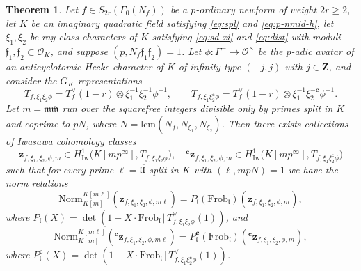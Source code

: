\documentclass[10pt,letterpaper]{amsart}
\theoremstyle{plain}
\newtheorem{thm}{Theorem}[subsection] %
\theoremstyle{definition}
\theoremstyle{definition}
\theoremstyle{plain}
\theoremstyle{plain}
\theoremstyle{plain}
\theoremstyle{remark}
\numberwithin{equation}{section}
\newcommand{\cc}{\mathbf{c}}
\newcommand{\fkm}{\mathfrak{m}}
\newcommand{\fkmbar}{\overline{\mathfrak{m}}}
\newcommand{\fkf}{\mathfrak{f}}
\newcommand{\fkl}{\mathfrak{l}}
\newcommand{\fklbar}{\overline{\mathfrak{l}}}
\def\cO{\mathcal O}
\newcommand{\Z}{\mathbf{Z}}
\begin{document}
\begin{thm}\label{maintheorem2}
Let $f\in S_{2r}(\Gamma_0(N_f))$ be a $p$-ordinary newform of weight $2r\geq 2$, let $K$ be an imaginary quadratic field satisfying \eqref{eq:spl} and \eqref{eq:p-nmid-h}, let $\xi_1,\xi_2$ be ray class characters of $K$ satisfying \eqref{eq:sd-xi} and \eqref{eq:dist} with moduli $\fkf_1,\fkf_2\subset\cO_K$, and suppose $(p,N_f\fkf_1\fkf_2)=1$.  Let $\phi:\Gamma^-\rightarrow\cO^\times$ be the $p$-adic avatar of an anticyclotomic Hecke character of $K$ of infinity type $(-j,j)$ with $j\in\Z$, and consider the $G_K$-representations
\[
T_{f,\xi_1\xi_2\phi}=T_f^\vee(1-r)\otimes\xi_1^{-1}\xi_2^{-1}\phi^{-1},\quad\quad T_{f,\xi_1\xi_2^\cc\phi}=T_f^\vee(1-r)\otimes\xi_1^{-1}\xi_2^{-\cc}\phi^{-1}.
\]
Let $m=\fkm\fkmbar$ run over the squarefree integers divisible only by primes split in $K$ and coprime to $pN$, where $N={\mathrm{lcm}}(N_f,N_{\xi_1},N_{\xi_2})$.  
Then there exists collections of Iwasawa cohomology classes
\[
\mathbf{z}_{f,\xi_1,\xi_2,\phi,m}\in H_{\mathrm{Iw}}^1\bigl(K[mp^\infty],T_{f,\xi_1\xi_2\phi}\bigr),\quad{}^\cc\mathbf{z}_{f,\xi_1,\xi_2,\phi,m}\in H_{\mathrm{Iw}}^1\bigl(K[mp^\infty],T_{f,\xi_1\xi_2^\cc\phi}\bigr)
\]
such that for every prime $\ell=\fkl\fklbar$ split in $K$ with $(\ell,mpN)=1$ we have the norm relations
\[
\mathrm{Norm}_{K[m]}^{K[m\ell]}(\mathbf{z}_{f,\xi_1,\xi_2,\phi,m\ell})=P_{\fkl}(\mathrm{Frob}_{\fkl})(\mathbf{z}_{f,\xi_1,\xi_2,\phi,m}),
\]
where $P_{\fkl}(X)=\det(1-X\cdot\mathrm{Frob}_{\fkl}\,|\,T_{f,\xi_1\xi_2\phi}^\vee(1))$, and
\[
\mathrm{Norm}_{K[m]}^{K[m\ell]}({}^\cc\mathbf{z}_{f,\xi_1,\xi_2,\phi,m\ell})=P^\cc_{\fkl}(\mathrm{Frob}_{\fkl})({}^\cc\mathbf{z}_{f,\xi_1,\xi_2,\phi,m}),
\]
where $P^\cc_{\fkl}(X)=\det(1-X\cdot \mathrm{Frob}_{\fkl}\,|\,T_{f,\xi_1\xi_2^\cc\phi}^\vee(1))$.
\end{thm}
\end{document}
